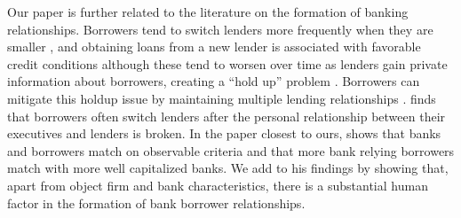 Our paper is further related to the literature on the formation of banking relationships. Borrowers tend to switch lenders more frequently when they are smaller \citep{Ongena.2001}, and obtaining loans from a new lender is associated with favorable credit conditions \citep{Gopalan2011} although these tend to worsen over time as lenders gain private information about borrowers, creating a ``hold up'' problem \citep{Ioannidou.2010, schenone2010lending, Sharpe.1990, Rajan.1992, Thadden.2004} . Borrowers can mitigate this holdup issue by maintaining multiple lending relationships \citep{Farinha.2002}. \citet{Karolyi.2017} finds that borrowers often switch lenders after the personal relationship between their executives and lenders is broken. In the paper closest to ours, \citet{Schwert2018} shows that banks and borrowers match on observable criteria and that more bank relying borrowers match with more well capitalized banks. We add to his findings by showing that, apart from object firm and bank characteristics, there is a substantial human factor in the formation of bank borrower relationships. 




